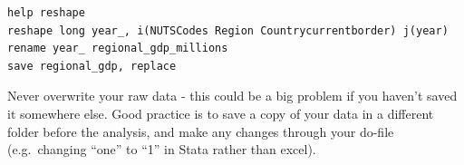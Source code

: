\documentclass[
  letterpaper,
  DIV=11,
  numbers=noendperiod]{scrartcl}
\begin{document}
\begin{verbatim}
help reshape
reshape long year_, i(NUTSCodes Region Countrycurrentborder) j(year)
rename year_ regional_gdp_millions
save regional_gdp, replace 
\end{verbatim}

\begin{tcolorbox}[enhanced jigsaw, breakable, arc=.35mm, coltitle=black, opacitybacktitle=0.6, colframe=quarto-callout-tip-color-frame, rightrule=.15mm, colbacktitle=quarto-callout-tip-color!10!white, toprule=.15mm, colback=white, toptitle=1mm, bottomtitle=1mm, titlerule=0mm, opacityback=0, left=2mm, leftrule=.75mm, title=\textcolor{quarto-callout-tip-color}{\faLightbulb}\hspace{0.5em}{Tip}, bottomrule=.15mm]

Never overwrite your raw data - this could be a big problem if you
haven't saved it somewhere else. Good practice is to save a copy of your
data in a different folder before the analysis, and make any changes
through your do-file (e.g.~changing ``one'' to ``1'' in Stata rather
than excel).

\end{tcolorbox}
\end{document}
